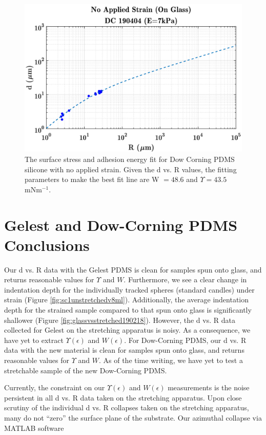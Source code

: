\begin{figure}[h]
	\centering
	\includegraphics[width=\linewidth]{Chapters/Figures/WUps_fit_DC190404}
	\caption[Dow Corning W-$\Upsilon $ Fit]{The surface stress and adhesion energy fit for Dow Corning PDMS silicone with no applied strain. Given the d vs. R values, the fitting parameters to make the best fit line are W $ = 48.6$ and  $\Upsilon = 43.5$ mNm$^{-1}$.}
	\label{fig:wupsfitdc190404}
\end{figure}

\section{Gelest and Dow-Corning PDMS Conclusions}
Our d vs. R data with the Gelest PDMS is clean for samples spun onto glass, and returns reasonable values for $ \Upsilon $ and $ W $. Furthermore, we see a clear change in indentation depth for the individually tracked spheres (standard candles) under strain (Figure \ref{fig:sc1unstretchedv8ml}). Additionally, the average indentation depth for the strained sample compared to that spun onto glass is significantly shallower (Figure \ref{fig:glassvsstretched190218}). However, the d vs. R data collected for Gelest on the stretching apparatus is noisy. As a consequence, we have yet to extract $ \Upsilon(\epsilon) $ and $ W(\epsilon) $. For Dow-Corning PDMS, our d vs. R data with the new material is clean for samples spun onto glass, and returns reasonable values for $ \Upsilon $ and $ W $. As of the time writing, we have yet to test a stretchable sample of the new Dow-Corning PDMS.

Currently, the constraint on our $ \Upsilon(\epsilon) $ and $ W(\epsilon) $ measurements is the noise persistent in all d vs. R data taken on the stretching apparatus. Upon close scrutiny of the individual d vs. R collapses taken on the stretching apparatus, many do not ``zero'' the surface plane of the substrate. Our azimuthal collapse via MATLAB software  
